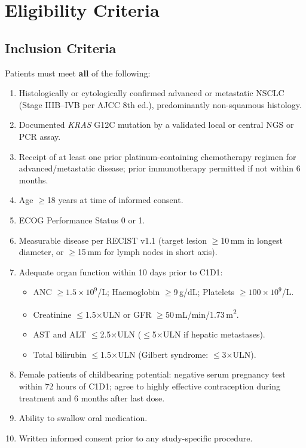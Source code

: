 \section{Eligibility Criteria}
\label{sec:eligibility}

\subsection{Inclusion Criteria}

Patients must meet \textbf{all} of the following:

\begin{enumerate}
  \item Histologically or cytologically confirmed advanced or metastatic NSCLC (Stage IIIB--IVB per AJCC 8th ed.), predominantly non-squamous histology.
  \item Documented \textit{KRAS} G12C mutation by a validated local or central NGS or PCR assay.
  \item Receipt of at least one prior platinum-containing chemotherapy regimen for advanced/metastatic disease; prior immunotherapy permitted if not within 6 months.
  \item Age $\geq$18 years at time of informed consent.
  \item ECOG Performance Status 0 or 1.
  \item Measurable disease per RECIST v1.1 (target lesion $\geq$10\,mm in longest diameter, or $\geq$15\,mm for lymph nodes in short axis).
  \item Adequate organ function within 10 days prior to C1D1:
    \begin{itemize}
      \item ANC $\geq 1.5 \times 10^9$/L; Haemoglobin $\geq$9\,g/dL; Platelets $\geq 100 \times 10^9$/L.
      \item Creatinine $\leq$1.5$\times$ULN or GFR $\geq$50\,mL/min/1.73\,m\textsuperscript{2}.
      \item AST and ALT $\leq$2.5$\times$ULN ($\leq$5$\times$ULN if hepatic metastases).
      \item Total bilirubin $\leq$1.5$\times$ULN (Gilbert syndrome: $\leq$3$\times$ULN).
    \end{itemize}
  \item Female patients of childbearing potential: negative serum pregnancy test within 72 hours of C1D1; agree to highly effective contraception during treatment and 6 months after last dose.
  \item Ability to swallow oral medication.
  \item Written informed consent prior to any study-specific procedure.
\end{enumerate}


